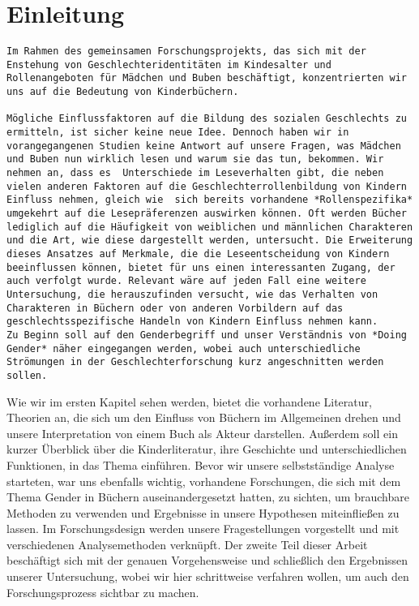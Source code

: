 \onehalfspace

\chapter{Einleitung}

\begin{verbatim}
Im Rahmen des gemeinsamen Forschungsprojekts, das sich mit der Enstehung von Geschlechteridentitäten im Kindesalter und Rollenangeboten für Mädchen und Buben beschäftigt, konzentrierten wir uns auf die Bedeutung von Kinderbüchern.

Mögliche Einflussfaktoren auf die Bildung des sozialen Geschlechts zu ermitteln, ist sicher keine neue Idee. Dennoch haben wir in vorangegangenen Studien keine Antwort auf unsere Fragen, was Mädchen und Buben nun wirklich lesen und warum sie das tun, bekommen. Wir nehmen an, dass es  Unterschiede im Leseverhalten gibt, die neben vielen anderen Faktoren auf die Geschlechterrollenbildung von Kindern Einfluss nehmen, gleich wie  sich bereits vorhandene *Rollenspezifika* umgekehrt auf die Lesepräferenzen auswirken können. Oft werden Bücher lediglich auf die Häufigkeit von weiblichen und männlichen Charakteren und die Art, wie diese dargestellt werden, untersucht. Die Erweiterung dieses Ansatzes auf Merkmale, die die Leseentscheidung von Kindern beeinflussen können, bietet für uns einen interessanten Zugang, der auch verfolgt wurde. Relevant wäre auf jeden Fall eine weitere Untersuchung, die herauszufinden versucht, wie das Verhalten von Charakteren in Büchern oder von anderen Vorbildern auf das geschlechtsspezifische Handeln von Kindern Einfluss nehmen kann.
Zu Beginn soll auf den Genderbegriff und unser Verständnis von *Doing Gender* näher eingegangen werden, wobei auch unterschiedliche Strömungen in der Geschlechterforschung kurz angeschnitten werden sollen. 
\end{verbatim}

Wie wir im ersten Kapitel sehen werden, bietet die vorhandene Literatur,
Theorien an, die sich um den Einfluss von Büchern im Allgemeinen drehen
und unsere Interpretation von einem Buch als Akteur darstellen. Außerdem
soll ein kurzer Überblick über die Kinderliteratur, ihre Geschichte und
unterschiedlichen Funktionen, in das Thema einführen. Bevor wir unsere
selbstständige Analyse starteten, war uns ebenfalls wichtig, vorhandene
Forschungen, die sich mit dem Thema Gender in Büchern auseinandergesetzt
hatten, zu sichten, um brauchbare Methoden zu verwenden und Ergebnisse
in unsere Hypothesen miteinfließen zu lassen. Im Forschungsdesign werden
unsere Fragestellungen vorgestellt und mit verschiedenen Analysemethoden
verknüpft. Der zweite Teil dieser Arbeit beschäftigt sich mit der
genauen Vorgehensweise und schließlich den Ergebnissen unserer
Untersuchung, wobei wir hier schrittweise verfahren wollen, um auch den
Forschungsprozess sichtbar zu machen.
